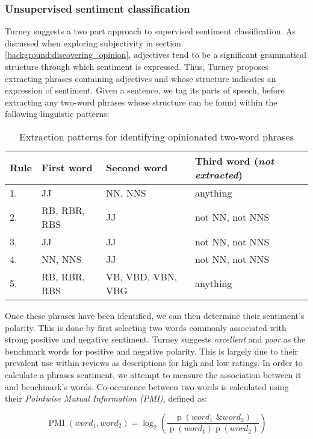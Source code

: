 \subsubsection{Unsupervised sentiment classification}

Turney \cite{Turney:2002vv} suggests a two part approach to supervised sentiment classification. As discussed when exploring subjectivity in section \ref{background:discovering_opinion}, adjectives tend to be a significant grammatical structure through which sentiment is expressed. Thus, Turney proposes extracting phrases containing adjectives and whose structure indicates an expression of sentiment. Given a sentence, we tag its parts of speech, before extracting any two-word phrases whose structure can be found within the following linguistic patterns:

\begin{table}[h]
	\caption{Extraction patterns for identifying opinionated two-word phrases}
	\centering
	\begin{tabular}
		{ l | l l l }
		Rule & First word & Second word & Third word (\emph{not extracted}) \\ \hline
	  1. & JJ & NN, NNS & anything \\
		2. & RB, RBR, RBS & JJ & not NN, not NNS \\
		3. & JJ & JJ & not NN, not NNS \\
		4. & NN, NNS & JJ & not NN, not NNS \\
		5. & RB, RBR, RBS & VB, VBD, VBN, VBG & anything \\
	\end{tabular}
\end{table}

Once these phrases have been identified, we can then determine their sentiment's polarity. This is done by first selecting two words commonly associated with strong positive and negative sentiment. Turney suggests \emph{excellent} and \emph{poor} as the benchmark words for positive and negative polarity. This is largely due to their prevalent use within reviews as descriptions for high and low ratings. In order to calculate a phrases sentiment, we attempt to measure the association between it and benchmark's words. Co-occurence between two words is calculated using their \emph{Pointwise Mutual Information (PMI)}, defined as:

\begin{equation}
	\operatorname{PMI}(word_1, word_2) = \log_2 \left(\frac{\operatorname{p}(word_1 \textit{ \& } word_2)}{\operatorname{p}(word_1)\operatorname{p}(word_2)}\right)
\end{equation}

